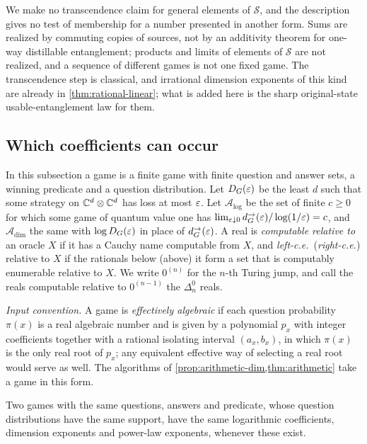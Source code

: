 We make no transcendence claim for general elements of $\mathcal S$, and the description gives no test of membership for a number
presented in another form. Sums are realized by commuting copies of sources, not by an additivity theorem for one-way distillable
entanglement; products and limits of elements of $\mathcal S$ are not realized, and a sequence of different games is not one fixed game.
The transcendence step is classical, and irrational dimension exponents of this kind are already in \cref{thm:rational-linear}; what is
added here is the sharp original-state usable-entanglement law for them.

\subsection{Which coefficients can occur}\label{sec:arithmetic}

In this subsection a game is a finite game with finite question and answer sets, a winning predicate and a question distribution. Let
$D_G(\varepsilon)$ be the least $d$ such that some strategy on $\mathbb C^d\otimes\mathbb C^d$ has loss at most $\varepsilon$. Let $\mathcal A_{\log}$ be the set of finite
$c\ge0$ for which some game of quantum value one has $\lim_{\varepsilon\downarrow0}d^\to_G(\varepsilon)/\log(1/\varepsilon)=c$, and $\mathcal A_{\dim}$ the same with
$\log D_G(\varepsilon)$ in place of $d^\to_G(\varepsilon)$. A real is \emph{computable relative to} an oracle $X$ if it has a Cauchy name computable from
$X$, and \emph{left-c.e.}\ (\emph{right-c.e.}) relative to $X$ if the rationals below (above) it form a set that is computably enumerable
relative to $X$. We write $0^{(n)}$ for the $n$-th Turing jump, and call the reals computable relative to $0^{(n-1)}$ the $\Delta^0_n$ reals.

\emph{Input convention.} A game is \emph{effectively algebraic} if each question probability $\pi(x)$ is a real algebraic number and is
given by a polynomial $p_x$ with integer coefficients together with a rational isolating interval $(a_x,b_x)$, in which $\pi(x)$ is the only
real root of $p_x$; any equivalent effective way of selecting a real root would serve as well. The algorithms of
\cref{prop:arithmetic-dim,thm:arithmetic} take a game in this form.

\begin{lemma}[Reweighting]\label{lem:reweighting}
Two games with the same questions, answers and predicate, whose question distributions have the same support, have the same logarithmic
coefficients, dimension exponents and power-law exponents, whenever these exist.
\end{lemma}


